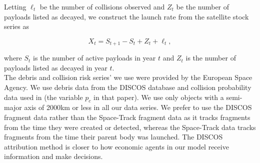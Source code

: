 \documentclass[12pt]{article}
\begin{document}

Letting $\ell_t$ be the number of collisions observed and $Z_t$ be the number of payloads listed as decayed, we construct the launch rate from the satellite stock series as

\begin{equation}
\label{launchRateAccounting}
X_t = S_{t+1} - S_t + Z_t + \ell_t,
\end{equation}

where $S_t$ is the number of active payloads in year $t$ and $Z_t$ is the number of payloads listed as decayed in year $t$. \\

The debris and collision risk series' we use were provided by the European Space Agency. We use debris data from the DISCOS database \citep{FRAGdata} and collision probability data used in \citep{ECOBdata} (the variable $p_c$ in that paper). We use only objects with a semi-major axis of 2000km or less in all our data series. We prefer to use the DISCOS fragment data rather than the Space-Track fragment data as it tracks fragments from the time they were created or detected, whereas the Space-Track data tracks fragments from the time their parent body was launched. The DISCOS attribution method is closer to how economic agents in our model receive information and make decisions. %
\end{document}
